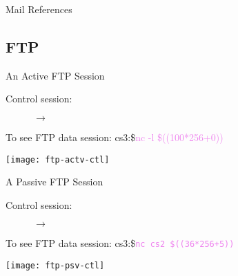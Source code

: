 \begin{frame}[allowframebreaks]{Mail References}
  \begin{refsection}
    \nocite{wiki:smtp, wiki:pop, wiki:imap, wiki:mime, rfc2821, rfc1939,
      rfc3501, rfc2045}
    \printbibliography[heading=none]
  \end{refsection}
\end{frame}

\subsection{FTP}
  
\begin{frame}
  \centering
  \label{fig:model}
\end{frame}

\begin{frame}{An Active FTP Session}
  \begin{minipage}{.4\linewidth}
    \begin{description}
    \item[Control session:] $\longrightarrow$
    \end{description}
    \begin{iblock}{To see FTP data session:}
      {\ttfamily\small cs3:\$\quad\textcolor{violet}{nc -l \$((100*256+0))}}
    \end{iblock}
  \end{minipage}\hfill
  \begin{minipage}{.6\linewidth}
    \texttt{[image: ftp-actv-ctl]}
  \end{minipage}
\end{frame}

            
\begin{frame}{A Passive FTP Session}
  \begin{minipage}{.4\linewidth}
    \begin{description}
    \item[Control session:] $\longrightarrow$
    \end{description}
    \begin{iblock}{To see FTP data session:}
      {\ttfamily\small cs3:\$}\quad\textcolor{violet}{\texttt{nc cs2 \$((36*256+5))}}
    \end{iblock}
  \end{minipage}\hfill
  \begin{minipage}{.6\linewidth}
    \texttt{[image: ftp-psv-ctl]}
  \end{minipage}
\end{frame}

